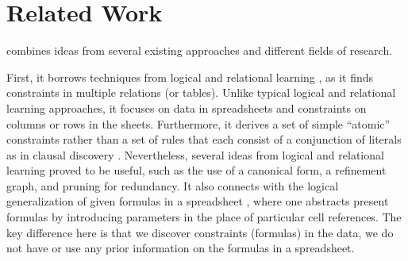 \section{Related Work}\label{sec:related_work}
\sname combines ideas from several existing approaches and different fields of research.

First, it borrows techniques from logical and relational learning \cite{luc_book}, as it finds
constraints in multiple relations (or tables). Unlike typical logical and relational learning
approaches, it focuses on data in spreadsheets and constraints on columns or rows in the sheets.
Furthermore, it derives a set of simple ``atomic'' constraints rather than a set of rules that each consist of a conjunction of literals as in clausal discovery \cite{claudien,lallouet}. Nevertheless, several ideas from logical and relational learning
proved to be useful, such as the use of a canonical form, a refinement graph, and pruning for redundancy. It also connects with the logical generalization of given formulas in a spreadsheet \cite{Isakowitz}, where one abstracts present formulas by introducing parameters in the place of particular cell references. The key difference here is that we discover constraints (formulas) in the data, we do not have or use any prior information on the formulas in a spreadsheet.


